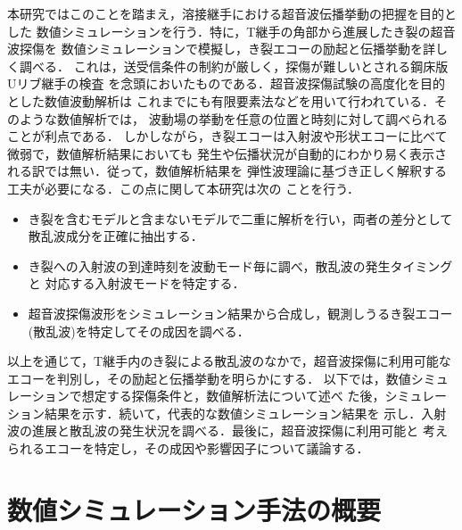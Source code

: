 \documentclass{jsce}
\begin{document}
本研究ではこのことを踏まえ，溶接継手における超音波伝播挙動の把握を目的とした
数値シミュレーションを行う．特に，T継手の角部から進展したき裂の超音波探傷を
数値シミュレーションで模擬し，き裂エコーの励起と伝播挙動を詳しく調べる．
これは，送受信条件の制約が厳しく，探傷が難しいとされる鋼床版Uリブ継手の検査
を念頭においたものである．超音波探傷試験の高度化を目的とした数値波動解析は
これまでにも有限要素法などを用いて行われている．そのような数値解析では，
波動場の挙動を任意の位置と時刻に対して調べられることが利点である．
しかしながら，き裂エコーは入射波や形状エコーに比べて微弱で，数値解析結果においても
発生や伝播状況が自動的にわかり易く表示される訳では無い．従って，数値解析結果を
弾性波理論に基づき正しく解釈する工夫が必要になる．この点に関して本研究は次の
ことを行う．
\begin{itemize}
\item
	き裂を含むモデルと含まないモデルで二重に解析を行い，両者の差分として
	散乱波成分を正確に抽出する．
\item
	き裂への入射波の到達時刻を波動モード毎に調べ，散乱波の発生タイミングと
	対応する入射波モードを特定する．
\item
	超音波探傷波形をシミュレーション結果から合成し，観測しうるき裂エコー
	(散乱波)を特定してその成因を調べる．
\end{itemize}
以上を通じて，T継手内のき裂による散乱波のなかで，超音波探傷に利用可能な
エコーを判別し，その励起と伝播挙動を明らかにする．
以下では，数値シミュレーションで想定する探傷条件と，数値解析法について述べ
た後，シミュレーション結果を示す．続いて，代表的な数値シミュレーション結果を
示し．入射波の進展と散乱波の発生状況を調べる．最後に，超音波探傷に利用可能と
考えられるエコーを特定し，その成因や影響因子について議論する．
\section{数値シミュレーション手法の概要}
\end{document}
